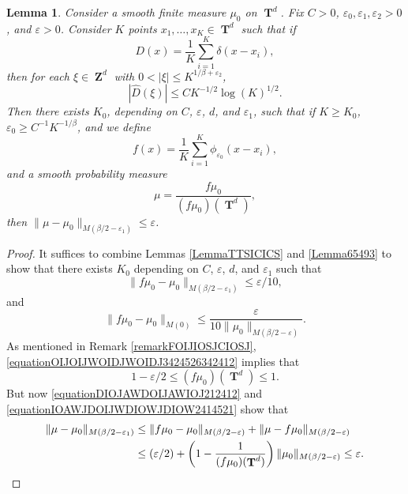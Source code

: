\documentclass[12pt,reqno]{article}
\numberwithin{equation}{section}
\DeclareMathOperator{\ZZ}{\mathbf{Z}}
\DeclareMathOperator{\TT}{\mathbf{T}}
\newtheorem{lemma}{Lemma}
\begin{document}
\begin{lemma} \label{lemmaIOJDD23124}
    Consider a smooth finite measure $\mu_0$ on $\TT^d$. Fix $C > 0$, $\varepsilon_0, \varepsilon_1, \varepsilon_2 > 0$, and $\varepsilon > 0$. Consider $K$ points $x_1, \dots, x_K \in \TT^d$ such that if
    \[ D(x) = \frac{1}{K} \sum_{i = 1}^K \delta(x - x_i), \]
    then for each $\xi \in \ZZ^d$ with $0 < |\xi| \leq K^{1/\beta + \varepsilon_2}$,
    \begin{equation} \label{equationFFOSOXPFFGHI}
        |\widehat{D}(\xi)| \leq C K^{-1/2} \log(K)^{1/2}.
    \end{equation}
    Then there exists $K_0$, depending on $C$, $\varepsilon$, $d$, and $\varepsilon_1$, such that if $K \geq K_0$, $\varepsilon_0 \geq C^{-1} K^{-1/\beta}$, and we define
    \[ f(x) = \frac{1}{K} \sum_{i = 1}^K \phi_{\varepsilon_0}(x - x_i), \]
    and a smooth probability measure
    \[ \mu = \frac{f \mu_0}{(f \mu_0)(\TT^d)}, \]
    then $\| \mu - \mu_0 \|_{M(\beta/2 - \varepsilon_1)} \leq \varepsilon$.
\end{lemma}
\begin{proof}
    It suffices to combine Lemmas \ref{LemmaTTSICICS} and \ref{Lemma65493} to show that there exists $K_0$ depending on $C$, $\varepsilon$, $d$, and $\varepsilon_1$ such that
    \begin{equation} \label{equationDIOJAWDOIJAWIOJ212412}
        \| f \mu_0 - \mu_0 \|_{M(\beta/2 - \varepsilon_1)} \leq \varepsilon/10,
    \end{equation}
    and
    \begin{equation} \label{equationOIJOIJWOIDJWOIDJ3424526342412}
        \| f \mu_0 - \mu_0 \|_{M(0)} \leq \frac{\varepsilon}{10 \| \mu_0 \|_{M(\beta/2 - \varepsilon)}}.
    \end{equation}
    As mentioned in Remark \ref{remarkFOIJIOSJCIOSJ}, \eqref{equationOIJOIJWOIDJWOIDJ3424526342412} implies that
    \begin{equation} \label{equationIOAWJDOIJWDIOWJDIOW2414521}
        1 - \varepsilon/2 \leq (f\mu_0)(\TT^d) \leq 1.
    \end{equation}
    But now \eqref{equationDIOJAWDOIJAWIOJ212412} and \eqref{equationIOAWJDOIJWDIOWJDIOW2414521} show that
    \begin{align*}
        \| \mu - \mu_0 \|_{M(\beta/2 - \varepsilon_1)} &\leq \| f \mu_0 - \mu_0 \|_{M(\beta/2 - \varepsilon)} + \| \mu - f \mu_0 \|_{M(\beta/2 - \varepsilon)}\\
        &\leq (\varepsilon/2) + \left( 1 - \frac{1}{(f \mu_0)(\TT^d)} \right) \| \mu_0 \|_{M(\beta/2 - \varepsilon)} \leq \varepsilon. \qedhere
    \end{align*}
\end{proof}
\end{document}
